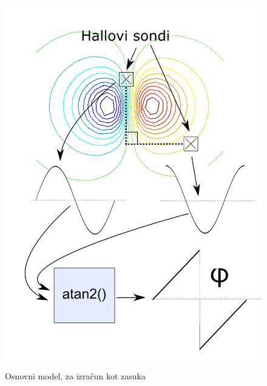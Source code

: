 \begin{figure}[h]
	\centering
	\includegraphics[width=0.9\columnwidth]{./Slike/opis_modela.png}
	\caption{Osnovni model, za izračun kot zasuka}
	\label{opis_modela}
\end{figure}
%
%
%
%
%
